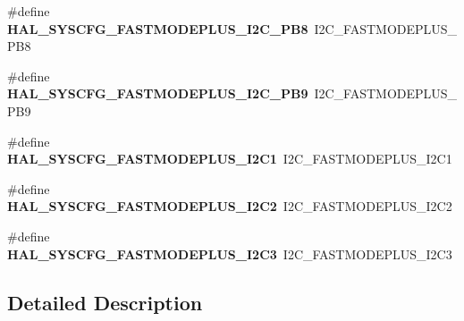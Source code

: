 \begin{DoxyCompactItemize}
\#define {\bfseries H\+A\+L\+\_\+\+S\+Y\+S\+C\+F\+G\+\_\+\+F\+A\+S\+T\+M\+O\+D\+E\+P\+L\+U\+S\+\_\+\+I2\+C\+\_\+\+P\+B8}~I2\+C\+\_\+\+F\+A\+S\+T\+M\+O\+D\+E\+P\+L\+U\+S\+\_\+\+P\+B8
\item 
\mbox{\label{group___h_a_l___s_y_s_c_f_g___aliased___defines_ga8ace04770933b1fbf1b0e28abd6f3a25}} 
\#define {\bfseries H\+A\+L\+\_\+\+S\+Y\+S\+C\+F\+G\+\_\+\+F\+A\+S\+T\+M\+O\+D\+E\+P\+L\+U\+S\+\_\+\+I2\+C\+\_\+\+P\+B9}~I2\+C\+\_\+\+F\+A\+S\+T\+M\+O\+D\+E\+P\+L\+U\+S\+\_\+\+P\+B9
\item 
\mbox{\label{group___h_a_l___s_y_s_c_f_g___aliased___defines_gad982b1937d6178bc74b6f95e3d343ab1}} 
\#define {\bfseries H\+A\+L\+\_\+\+S\+Y\+S\+C\+F\+G\+\_\+\+F\+A\+S\+T\+M\+O\+D\+E\+P\+L\+U\+S\+\_\+\+I2\+C1}~I2\+C\+\_\+\+F\+A\+S\+T\+M\+O\+D\+E\+P\+L\+U\+S\+\_\+\+I2\+C1
\item 
\mbox{\label{group___h_a_l___s_y_s_c_f_g___aliased___defines_gaa415be62939648ababfdce87dea7c8d4}} 
\#define {\bfseries H\+A\+L\+\_\+\+S\+Y\+S\+C\+F\+G\+\_\+\+F\+A\+S\+T\+M\+O\+D\+E\+P\+L\+U\+S\+\_\+\+I2\+C2}~I2\+C\+\_\+\+F\+A\+S\+T\+M\+O\+D\+E\+P\+L\+U\+S\+\_\+\+I2\+C2
\item 
\mbox{\label{group___h_a_l___s_y_s_c_f_g___aliased___defines_ga3347764cd910d40c261ffcfa150b0912}} 
\#define {\bfseries H\+A\+L\+\_\+\+S\+Y\+S\+C\+F\+G\+\_\+\+F\+A\+S\+T\+M\+O\+D\+E\+P\+L\+U\+S\+\_\+\+I2\+C3}~I2\+C\+\_\+\+F\+A\+S\+T\+M\+O\+D\+E\+P\+L\+U\+S\+\_\+\+I2\+C3
\end{DoxyCompactItemize}


\subsection{Detailed Description}
